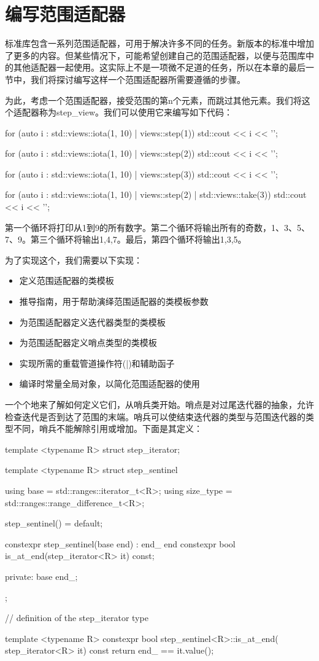 \section{编写范围适配器}
标准库包含一系列范围适配器，可用于解决许多不同的任务。新版本的标准中增加了更多的内容。但某些情况下，可能希望创建自己的范围适配器，以便与范围库中的其他适配器一起使用。这实际上不是一项微不足道的任务，所以在本章的最后一节中，我们将探讨编写这样一个范围适配器所需要遵循的步骤。

为此，考虑一个范围适配器，接受范围的第n个元素，而跳过其他元素。我们将这个适配器称为step_view。我们可以使用它来编写如下代码：

\begin{cppcode}
for (auto i : std::views::iota(1, 10) | views::step(1))
	std::cout << i << '\n';

for (auto i : std::views::iota(1, 10) | views::step(2))
	std::cout << i << '\n';

for (auto i : std::views::iota(1, 10) | views::step(3))
	std::cout << i << '\n';

for (auto i : std::views::iota(1, 10) | views::step(2) | 	
				std::views::take(3))
	std::cout << i << '\n';
\end{cppcode}

第一个循环将打印从1到9的所有数字。第二个循环将输出所有的奇数，1、3、5、7、9。第三个循环将输出1,4,7。最后，第四个循环将输出1,3,5。

为了实现这个，我们需要以下实现：

\begin{itemize}
  \item 定义范围适配器的类模板
  \item 推导指南，用于帮助演绎范围适配器的类模板参数
  \item 为范围适配器定义迭代器类型的类模板
  \item 为范围适配器定义哨点类型的类模板
  \item 实现所需的重载管道操作符(|)和辅助函子
  \item 编译时常量全局对象，以简化范围适配器的使用
\end{itemize}

一个个地来了解如何定义它们，从哨兵类开始。哨点是对过尾迭代器的抽象，允许检查迭代是否到达了范围的末端。哨兵可以使结束迭代器的类型与范围迭代器的类型不同，哨兵不能解除引用或增加。下面是其定义：

\begin{cppcode}
template <typename R>
struct step_iterator;

template <typename R>
struct step_sentinel
{
	using base = std::ranges::iterator_t<R>;
	using size_type = std::ranges::range_difference_t<R>;
	
	step_sentinel() = default;
	
	constexpr step_sentinel(base end) : end_{ end } {}
	constexpr bool is_at_end(step_iterator<R> it) const;
	
private:
	base end_;
};

// definition of the step_iterator type

template <typename R>
constexpr bool step_sentinel<R>::is_at_end(
	step_iterator<R> it) const
{
	return end_ == it.value();
}
\end{cppcode}


